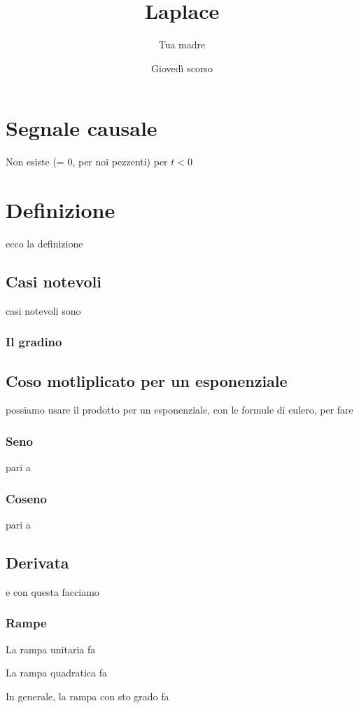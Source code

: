 \documentclass[11pt]{article}
\author{Tua madre}
\date{Giovedì scorso}
\title{Laplace}
\begin{document}
\maketitle
\tableofcontents


\section{Segnale causale}
\label{sec:org0e1f8fd}

Non esiste (= 0, per noi pezzenti) per \(t < 0\)

\section{Definizione}
\label{sec:org02019ea}

ecco la definizione

\subsection{Casi notevoli}
\label{sec:orgf5c6de1}

casi notevoli sono

\subsubsection{Il gradino}
\label{sec:orgeaf602e}

\subsection{Coso motliplicato per un esponenziale}
\label{sec:org391f8e4}

possiamo usare il prodotto per un esponenziale, con le formule di
eulero, per fare

\subsubsection{Seno}
\label{sec:org13c6999}

pari a

\subsubsection{Coseno}
\label{sec:org69a71b2}

pari a

\subsection{Derivata}
\label{sec:orgeeb3a89}

e con questa facciamo

\subsubsection{Rampe}
\label{sec:org1d299f0}

La rampa unitaria fa

La rampa quadratica fa

In generale, la rampa con sto grado fa
\end{document}
